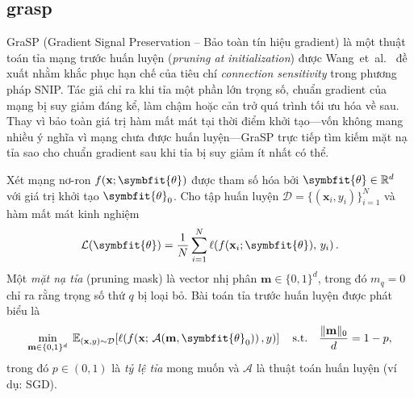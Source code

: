 \subsection{\gls{grasp}}
GraSP (Gradient Signal Preservation – Bảo toàn tín hiệu gradient) là
một thuật toán tỉa mạng trước huấn luyện (\textit{pruning at
    initialization}) được Wang~et~al.~\cite{grasp} đề xuất nhằm
khắc phục hạn chế của tiêu chí \textit{connection sensitivity} trong phương pháp
SNIP.
Tác giả chỉ ra khi tỉa một phần lớn trọng số, chuẩn gradient của
mạng bị suy giảm đáng kể, làm chậm hoặc cản trở quá trình tối ưu hóa về sau.
Thay vì bảo toàn giá trị hàm mất mát tại thời điểm khởi tạo—vốn không
mang nhiều ý nghĩa vì mạng chưa được huấn luyện—GraSP trực tiếp tìm kiếm
mặt nạ tỉa sao cho chuẩn gradient sau khi tỉa bị suy giảm ít nhất có thể.

Xét mạng nơ-ron $f(\mathbf{x};\symbfit{\theta})$ được tham số hóa bởi
$\symbfit{\theta} \in \mathbb{R}^{d}$ với giá trị khởi tạo $\symbfit{\theta}_0$.
Cho tập huấn luyện $\mathcal{D} = \{(\mathbf{x}_i, y_i)\}_{i=1}^{N}$
và hàm mất mát kinh nghiệm
\begin{equation}
    \mathcal{L}(\symbfit{\theta})
    = \frac{1}{N}\sum_{i=1}^{N}
    \ell\!\left(f(\mathbf{x}_i;\symbfit{\theta}),\, y_i\right).
\end{equation}
Một \emph{mặt nạ tỉa} (pruning mask) là vector nhị phân
$\mathbf{m} \in \{0,1\}^{d}$, trong đó $m_q = 0$ chỉ ra rằng trọng số
thứ $q$ bị loại bỏ.
Bài toán tỉa trước huấn luyện được phát biểu là
\begin{equation}
    \min_{\mathbf{m}\in\{0,1\}^d}
    \;\mathbb{E}_{(\mathbf{x},y)\sim\mathcal{D}}
    \!\left[\ell\!\left(f\!\left(\mathbf{x};\,
        \mathcal{A}(\mathbf{m},\symbfit{\theta}_0)\right), y\right)\right]
    \quad \text{s.t.} \quad
    \frac{\|\mathbf{m}\|_0}{d} = 1 - p,
    \label{eq:foresight_pruning}
\end{equation}
trong đó $p \in (0,1)$ là \emph{tỷ lệ tỉa} mong muốn và $\mathcal{A}$
là thuật toán huấn luyện (ví dụ: SGD).


